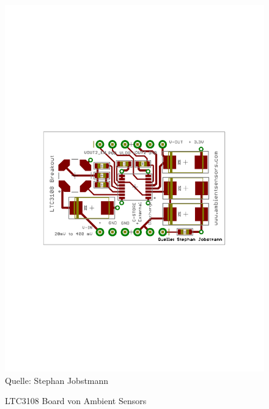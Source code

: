 \documentclass[12pt]{scrreprt} %
\begin{document}
\begin{figure}[htb]
\caption{LTC3108 Board von Ambient Sensors}
\centering
\includegraphics[bb=3.4cm 10.6cm 17.5cm 19.4cm]{Bilder/LTC3108breakoutSSOC}
\\Quelle: Stephan Jobstmann
\label{fig:4.1}
\end{figure}
\end{document}
